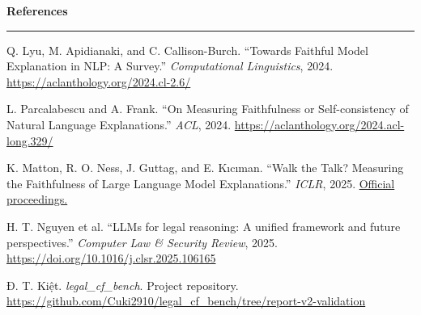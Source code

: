 \documentclass[12pt,a4paper]{article}
\newcommand{\heading}[1]{\textbf{#1}\par\nobreak\vspace{2pt}\hrule\vspace{4pt}}
\begin{document}
\begin{mdframed}[style=vinframe]
\heading{References}
\noindent[1] Q. Lyu, M. Apidianaki, and C. Callison-Burch. ``Towards Faithful Model Explanation in NLP: A Survey.'' \textit{Computational Linguistics}, 2024. \url{https://aclanthology.org/2024.cl-2.6/}

\noindent[2] L. Parcalabescu and A. Frank. ``On Measuring Faithfulness or Self-consistency of Natural Language Explanations.'' \textit{ACL}, 2024. \url{https://aclanthology.org/2024.acl-long.329/}

\noindent[3] K. Matton, R. O. Ness, J. Guttag, and E. Kıcıman. ``Walk the Talk? Measuring the Faithfulness of Large Language Model Explanations.'' \textit{ICLR}, 2025. \href{https://proceedings.iclr.cc/paper_files/paper/2025/hash/b5ec50eb177908f21f78ed0d76ed525c-Abstract-Conference.html}{Official proceedings.}

\noindent[4] H. T. Nguyen et al. ``LLMs for legal reasoning: A unified framework and future perspectives.'' \textit{Computer Law \& Security Review}, 2025. \url{https://doi.org/10.1016/j.clsr.2025.106165}

\noindent[5] Đ. T. Kiệt. \textit{legal\_cf\_bench}. Project repository. \url{https://github.com/Cuki2910/legal_cf_bench/tree/report-v2-validation}
\end{mdframed}
\end{document}
